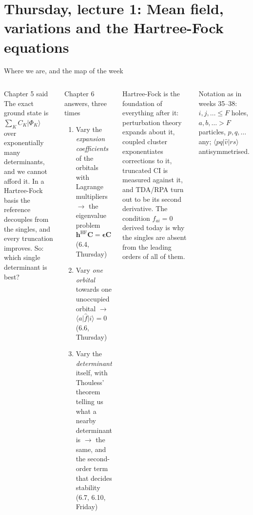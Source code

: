 \documentclass[aspectratio=169,10pt]{beamer}
\newcommand{\mbbox}[1]{%
  \begin{tcolorbox}[colback=paleblue,colframe=uioblue,title={\bfseries Many-body connection}]
  #1
  \end{tcolorbox}}
\newcommand{\ket}[1]{\vert #1\rangle}
\newcommand{\element}[3]{\langle #1\vert #2\vert #3\rangle}
\begin{document}
\section{Thursday, lecture 1: Mean field, variations and the Hartree-Fock equations}

\begin{frame}[shrink=1]{Where we are, and the map of the week}
  \footnotesize
  \begin{columns}[T]
    \begin{block}{Chapter 5 said}
      The exact ground state is $\sum_K C_K\ket{\Phi_K}$ over exponentially many determinants, and we cannot afford it. In a Hartree-Fock basis the reference decouples from the singles, and every truncation improves. \alert{So: which single determinant is best?}
    \end{block}
    \begin{block}{Chapter 6 answers, three times}
      \begin{enumerate}
        \item Vary the \emph{expansion coefficients} of the orbitals with Lagrange multipliers $\to$ the eigenvalue problem $\bm{h}^{\mathrm{HF}}\bm{C}=\bm{\epsilon}\bm{C}$ (6.4, Thursday)
        \item Vary \emph{one orbital} towards one unoccupied orbital $\to$ $\langle a\vert\hat{f}\vert i\rangle=0$ (6.6, Thursday)
        \item Vary the \emph{determinant} itself, with Thouless' theorem telling us what a nearby determinant is $\to$ the same, and the second-order term that decides stability (6.7, 6.10, Friday)
      \end{enumerate}
    \end{block}
    \mbbox{Hartree-Fock is the foundation of everything after it: perturbation theory expands about it, coupled cluster exponentiates corrections to it, truncated CI is measured against it, and TDA/RPA turn out to be its second derivative. The condition $f_{ai}=0$ derived today is why the singles are absent from the leading orders of all of them.}
    \vspace{0.1em}
    \footnotesize Notation as in weeks 35--38: $i,j,\dots\le F$ holes, $a,b,\dots>F$ particles, $p,q,\dots$ any; $\element{pq}{\hat{v}}{rs}$ antisymmetrised.
  \end{columns}
\end{frame}
\end{document}
